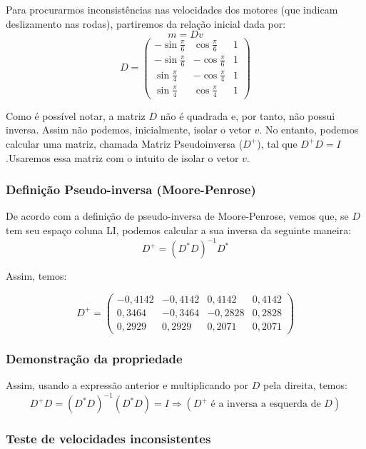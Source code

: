 \documentclass{article}
\begin{document}
Para procurarmos inconsistências nas velocidades dos motores (que indicam deslizamento nas rodas), partiremos da relação inicial dada por:
\[m = Dv\]
\[D
=
\begin{pmatrix}
  -\sin{\frac{\pi}{6}} &  \cos{\frac{\pi}{6}} & 1 \\
  -\sin{\frac{\pi}{6}} &  -\cos{\frac{\pi}{6}} &  1 \\
  \sin{\frac{\pi}{4}} & -\cos{\frac{\pi}{4}}   &  1  \\
  \sin{\frac{\pi}{4}} &  \cos{\frac{\pi}{4}} & 1
 \end{pmatrix}
\]

Como é possível notar, a matriz $D$ não é quadrada e, por tanto, não possui inversa. Assim não podemos, inicialmente, isolar o vetor $v$. No entanto, podemos calcular uma matriz, chamada Matriz Pseudoinversa ($D^+$), tal que $D^+D=I$ .Usaremos essa matriz com o intuito de isolar o vetor $v$.

\subsubsection{Definição Pseudo-inversa (Moore-Penrose)}

\hspace{1cm} De acordo com a definição de pseudo-inversa de Moore-Penrose, vemos que, se $D$ tem seu espaço coluna LI, podemos calcular a sua inversa da seguinte maneira:
\[ D^+ = (D^*D)^{-1} D^*\]

Assim, temos:

\[D^+
=
\begin{pmatrix}
  -0,4142    &-0,4142    & 0,4142    & 0,4142    \\
 0,3464 &  -0,3464 & -0,2828 & 0,2828 \\
 0,2929 & 0,2929 & 0,2071& 0,2071
 \end{pmatrix}
\]

\subsubsection{Demonstração da propriedade}

\hspace{1cm} Assim, usando a expressão anterior e multiplicando por $D$ pela direita, temos:
\[D^+D = (D^*D)^{-1}(D^*D) = I \Rightarrow (D^+ \text{ é a inversa a esquerda de }D)\]  

\subsubsection{Teste de velocidades inconsistentes}
\end{document}
